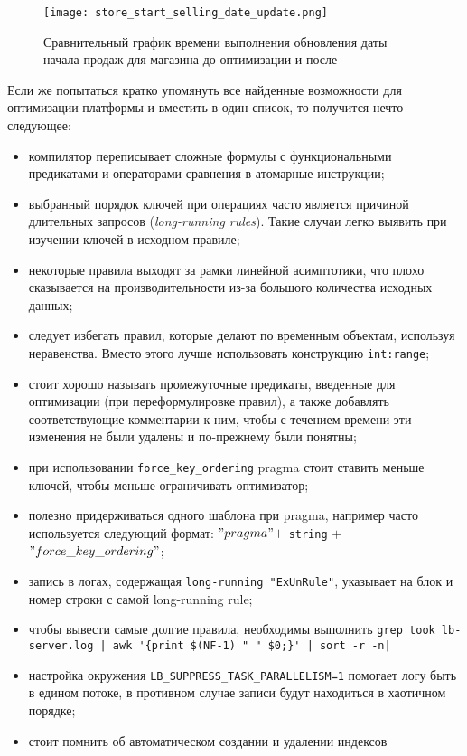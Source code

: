 \begin{figure}
	\centering
	\texttt{[image: store\_start\_selling\_date\_update.png]}
	\caption{Сравнительный график времени выполнения обновления даты начала продаж для магазина до оптимизации и после}
	\label{fig:summary:store_start_selling_date_update}
\end{figure}

Если же попытаться кратко упомянуть все найденные возможности для оптимизации платформы \LB и вместить в один список, то получится нечто следующее:

\begin{itemize}
  \item компилятор переписывает сложные формулы с функциональными предикатами и операторами сравнения в атомарные инструкции;
  \item выбранный порядок ключей при операциях \join часто является причиной длительных запросов (\emph{long-running rules}). Такие случаи легко выявить при изучении ключей в исходном правиле;
  \item некоторые правила выходят за рамки линейной асимптотики, что плохо сказывается на производительности из-за большого количества исходных данных;
  \item следует избегать правил, которые делают \join по временным объектам, используя неравенства. Вместо этого лучше использовать конструкцию \lstinline{int:range};
  \item стоит хорошо называть промежуточные предикаты, введенные для оптимизации (при переформулировке правил), а также добавлять соответствующие комментарии к ним, чтобы с течением времени эти изменения не были удалены и по-прежнему были понятны;
  \item при использовании \lstinline{force_key_ordering} pragma стоит ставить меньше ключей, чтобы меньше ограничивать оптимизатор;
  \item полезно придерживаться одного шаблона при pragma, например часто используется следующий формат: $"pragma" + $ \lstinline{string} $ +$\linebreak $ "force\_key\_ordering"$;
  \item запись в логах, содержащая \lstinline{long-running "ExUnRule"}, указывает на блок и номер строки с самой long-running rule;
  \item чтобы вывести самые долгие правила, необходимы выполнить \lstinline{grep took lb-server.log |}\lstinline| awk '{print $(NF-1) " " $0;}'|\lstinline{ | sort -r -n|}
  \item настройка окружения \lstinline{LB_SUPPRESS_TASK_PARALLELISM=1} помогает логу быть в едином потоке, в противном случае записи будут находиться в хаотичном порядке;
  \item стоит помнить об автоматическом создании и удалении индексов
\end{itemize}
